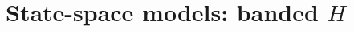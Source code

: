\documentclass{admbmanual}
\begin{document}
%
%
%
%

\section{State-space models: banded $H$}
\label{sec:state-space}
\end{document}
